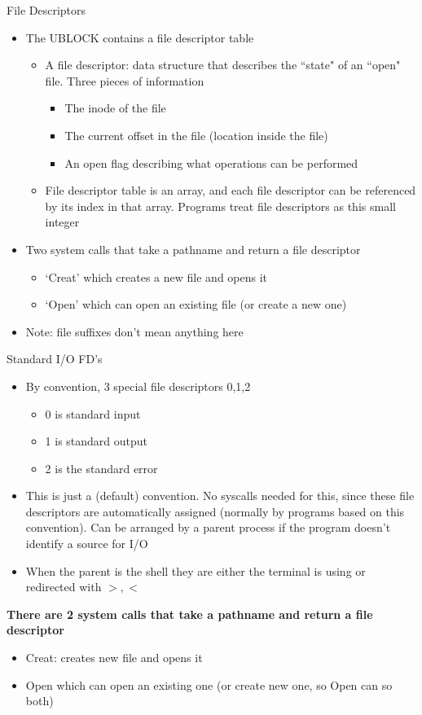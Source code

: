 File Descriptors
\begin{itemize}
    \item The UBLOCK contains a file descriptor table
    \begin{itemize}
        \item A file descriptor: data structure that describes the ``state" of an ``open" file. Three pieces of information
        \begin{itemize}
            \item The inode of the file
            \item The current offset in the file (location inside the file)
            \item An open flag describing what operations can be performed
        \end{itemize}
        \item File descriptor table is an array, and each file descriptor can be referenced by its index in that array. Programs treat file descriptors as this small integer
    \end{itemize}
    \item Two system calls that take a pathname and return a file descriptor
    \begin{itemize}
        \item `Creat' which creates a new file and opens it
        \item `Open' which can open an existing file (or create a new one)
    \end{itemize}
    \item Note: file suffixes don't mean anything here
\end{itemize}
Standard I/O FD's
\begin{itemize}
    \item By convention, 3 special file descriptors 0,1,2
    \begin{itemize}
        \item 0 is standard input
        \item 1 is standard output
        \item 2 is the standard error
    \end{itemize}
    \item This is just a (default) convention. No syscalls needed for this, since these file descriptors are automatically assigned (normally by programs based on this convention). Can be arranged by a parent process if the program doesn't identify a source for I/O
    \item When the parent is the shell they are either the terminal is using or redirected with $>, <$
\end{itemize}
\textbf{There are 2 system calls that take a pathname and return a file descriptor}
\begin{itemize}
    \item Creat: creates new file and opens it
    \item Open which can open an existing one (or create new one, so Open can so both)
\end{itemize}

